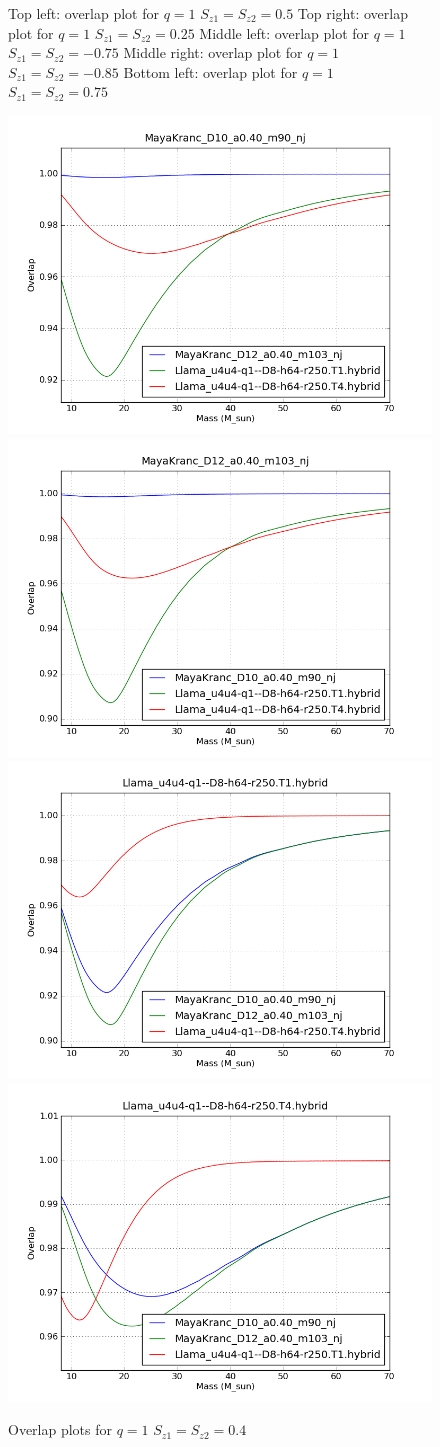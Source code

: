 \begin{figure}
  \caption[Multiple NINJA-2 overlap plots]{
  \label{f:figure_1_0d5}
Top left: overlap plot for $q=1$ $S_{z1} = S_{z2} = 0.5$
Top right: overlap plot for $q=1$ $S_{z1} = S_{z2} = 0.25$
Middle left: overlap plot for $q=1$ $S_{z1} = S_{z2} = -0.75$
Middle right: overlap plot for $q=1$ $S_{z1} = S_{z2} = -0.85$
Bottom left: overlap plot for $q=1$ $S_{z1} = S_{z2} = 0.75$}
\end{figure}%

\begin{figure}
  \includegraphics[width=0.5\linewidth]{figures/ninja2/figure_1_0d4_03.png} 
  \includegraphics[width=0.5\linewidth]{figures/ninja2/figure_1_0d4_06.png} \\
  \includegraphics[width=0.5\linewidth]{figures/ninja2/figure_1_0d4_09.png} 
  \includegraphics[width=0.5\linewidth]{figures/ninja2/figure_1_0d4_12.png} \\
  \caption[Overlap plots for $q=1$ $S_{z1} = S_{z2} = 0.4$]{
  \label{f:figure_1_0d4}
Overlap plots for $q=1$ $S_{z1} = S_{z2} = 0.4$}
\end{figure}%


